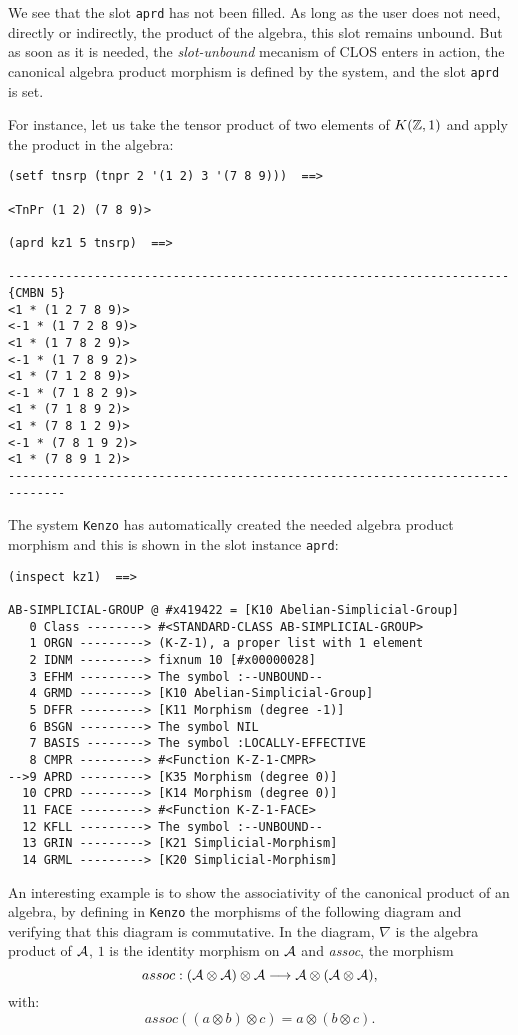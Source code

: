 We see that  the slot {\tt aprd} has not been filled. As long as the user does not  need, directly or indirectly,
the product of the algebra, this slot remains unbound. But as soon as it is needed, the {\em slot-unbound}
mecanism of CLOS enters in action, the canonical algebra product morphism is defined by the system, and the slot
{\tt aprd} is set.\par
For instance, let us take the tensor product of two elements of  $K({\mathbb{Z}}, 1)$ and apply the
product in the algebra:
{\footnotesize\begin{verbatim}
(setf tnsrp (tnpr 2 '(1 2) 3 '(7 8 9)))  ==>

<TnPr (1 2) (7 8 9)>

(aprd kz1 5 tnsrp)  ==>

----------------------------------------------------------------------{CMBN 5}
<1 * (1 2 7 8 9)>
<-1 * (1 7 2 8 9)>
<1 * (1 7 8 2 9)>
<-1 * (1 7 8 9 2)>
<1 * (7 1 2 8 9)>
<-1 * (7 1 8 2 9)>
<1 * (7 1 8 9 2)>
<1 * (7 8 1 2 9)>
<-1 * (7 8 1 9 2)>
<1 * (7 8 9 1 2)>
------------------------------------------------------------------------------
\end{verbatim}}
The system {\tt Kenzo} has automatically created the needed algebra product morphism  and
this is shown in the slot instance {\tt aprd}:
{\footnotesize\begin{verbatim}
(inspect kz1)  ==>

AB-SIMPLICIAL-GROUP @ #x419422 = [K10 Abelian-Simplicial-Group]
   0 Class --------> #<STANDARD-CLASS AB-SIMPLICIAL-GROUP>
   1 ORGN ---------> (K-Z-1), a proper list with 1 element
   2 IDNM ---------> fixnum 10 [#x00000028]
   3 EFHM ---------> The symbol :--UNBOUND--
   4 GRMD ---------> [K10 Abelian-Simplicial-Group]
   5 DFFR ---------> [K11 Morphism (degree -1)]
   6 BSGN ---------> The symbol NIL
   7 BASIS --------> The symbol :LOCALLY-EFFECTIVE
   8 CMPR ---------> #<Function K-Z-1-CMPR>
-->9 APRD ---------> [K35 Morphism (degree 0)]
  10 CPRD ---------> [K14 Morphism (degree 0)]
  11 FACE ---------> #<Function K-Z-1-FACE>
  12 KFLL ---------> The symbol :--UNBOUND--
  13 GRIN ---------> [K21 Simplicial-Morphism]
  14 GRML ---------> [K20 Simplicial-Morphism]
\end{verbatim}}

An interesting example is to show the associativity of the canonical product of
an algebra, by defining in {\tt Kenzo} the morphisms of the following diagram
and verifying that this diagram is commutative. In the diagram, $\nabla$ is the
algebra product of ${\cal A}$, $1$ is the identity morphism on ${\cal A}$ and
{\em assoc}, the morphism
$$assoc: ({\cal A}\otimes {\cal A}) \otimes {\cal A} \longrightarrow {\cal A} \otimes ({\cal A}\otimes {\cal A}),$$
with:
$$assoc((a\otimes b)\otimes c) = a \otimes (b \otimes c).$$

